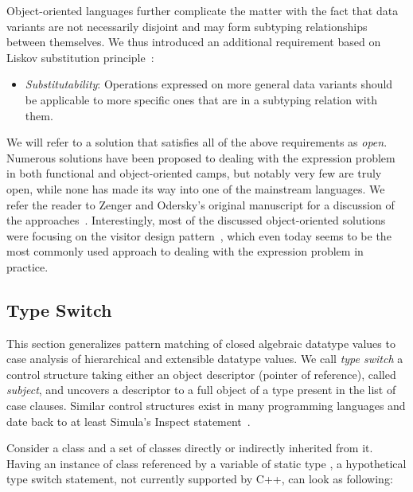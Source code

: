 \noindent
Object-oriented languages further complicate the matter with the fact that 
data variants are not necessarily disjoint and may form subtyping relationships  
between themselves. We thus introduced an additional requirement based on 
Liskov substitution principle~\cite{Lis87}:

\begin{itemize}
\setlength{\itemsep}{0pt}
\setlength{\parskip}{0pt}
\item \emph{Substitutability}: Operations expressed on more general data variants
      should be applicable to more specific ones that are in a subtyping relation 
      with them.
\end{itemize}


\noindent
We will refer to a solution that satisfies all of the above requirements as \emph{open}. 
Numerous solutions have been proposed to dealing with the expression problem in both 
functional and object-oriented camps, but notably very few are truly open, while 
none has made its way into one of the mainstream languages. We refer the reader 
to Zenger and Odersky's original manuscript for a discussion of the 
approaches~\cite{fool12}. Interestingly, most of the discussed object-oriented 
solutions were focusing on the visitor design pattern~\cite{DesignPatterns1993}, 
which even today seems to be the most commonly used approach to dealing with the 
expression problem in practice.

\subsection{Type Switch}

This section generalizes pattern matching of closed algebraic datatype values
to case analysis of hierarchical and extensible datatype values.
We call \emph{type switch} a control structure taking either an object
descriptor (pointer of reference), called \emph{subject}, and uncovers a 
descriptor to a full object of a type present in the list of case 
clauses. Similar control structures exist in many programming languages and 
date back to at least Simula's Inspect statement~\cite{Simula67}.

Consider a class  and a set of classes  directly 
or indirectly inherited from it. Having an instance of class  referenced 
by a variable  of static type , a hypothetical type switch 
statement, not currently supported by C++, can look as following:

